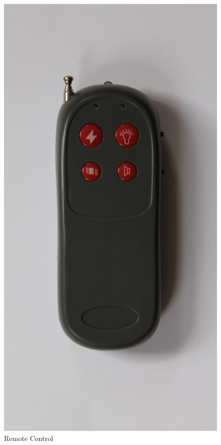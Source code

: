 \documentclass[a4paper]{article}
\begin{document}
\begin{figure}
	\centerline{\includegraphics[scale=0.05]{remotecontrol.jpeg}}
	\caption{\label{remotecontrol}Remote Control}
\end{figure}
\end{document}
